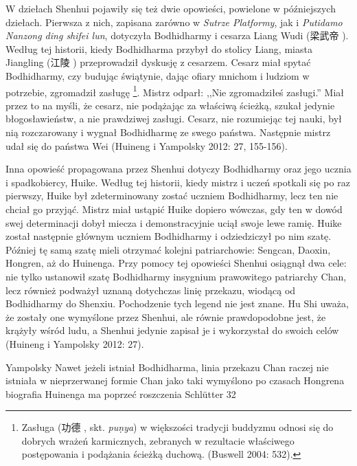 W dziełach Shenhui pojawiły się też dwie opowieści, powielone w późniejszych dziełach. Pierwsza z nich, zapisana zarówno w \textit{Sutrze Platformy}, jak i \textit{Putidamo Nanzong ding shifei lun}, dotyczyła Bodhidharmy i cesarza Liang Wudi (梁武帝 ).
Według tej historii, kiedy Bodhidharma przybył do stolicy Liang, miasta Jiangling (江陵 ) przeprowadził dyskusję z cesarzem. Cesarz miał spytać Bodhidharmy, czy budując świątynie, dając ofiary mnichom i ludziom w potrzebie, zgromadził zasługę%
\footnote{Zasługa (功德 , skt. \textit{pu\d{n}ya}) w większości tradycji buddyzmu odnosi się do dobrych wrażeń karmicznych, zebranych w rezultacie właściwego postępowania i podążania ścieżką duchową. (Buswell 2004: 532).}.
Mistrz odparł: ,,Nie zgromadziłeś zasługi.'' Miał przez to na myśli, że cesarz, nie podążając za właściwą ścieżką, szukał jedynie błogosławieństw, a nie prawdziwej zasługi. Cesarz, nie rozumiejąc tej nauki, był nią rozczarowany i wygnał Bodhidharmę ze swego państwa. Następnie mistrz udał się do państwa Wei\label{LiangWuDi} (Huineng i Yampolsky 2012: 27, 155-156).


Inna opowieść propagowana przez Shenhui dotyczy Bodhidharmy oraz jego ucznia i spadkobiercy, Huike. Według tej historii, kiedy mistrz i uczeń spotkali się po raz pierwszy, Huike był zdeterminowany zostać uczniem Bodhidharmy, lecz ten nie chciał go przyjąć. Mistrz miał ustąpić Huike dopiero wówczas, gdy ten w dowód swej determinacji dobył miecza i demonstracyjnie uciął swoje lewe ramię. Huike został następnie głównym uczniem Bodhidharmy i odziedziczył po nim szatę. Później tę samą szatę mieli otrzymać kolejni patriarchowie: Sengcan, Daoxin, Hongren, aż do Huinenga. Przy pomocy tej opowieści Shenhui osiągnął dwa cele: nie tylko ustanowił szatę Bodhidharmy insygnium prawowitego patriarchy Chan, lecz również podważył uznaną dotychczas linię przekazu, wiodącą od Bodhidharmy do Shenxiu. Pochodzenie tych legend nie jest znane. Hu Shi uważa, że zostały one wymyślone przez Shenhui, ale równie prawdopodobne jest, że krążyły wśród ludu, a Shenhui jedynie zapisał je i wykorzystał do swoich celów (Huineng i Yampolsky 2012: 27).

Yampolsky
Nawet jeżeli istniał Bodhidharma, linia przekazu Chan raczej nie istniała w nieprzerwanej formie
Chan jako taki wymyślono po czasach Hongrena
biografia Huinenga ma poprzeć roszczenia
Schlütter 32
\fi

